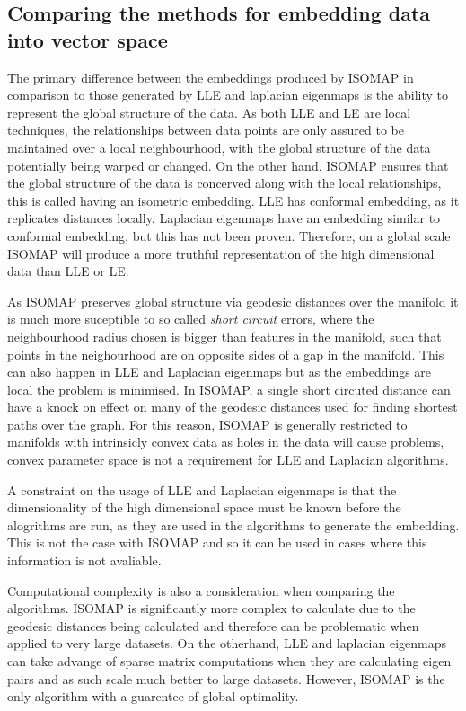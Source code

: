 \documentclass{article}
\begin{document}
\subsection{Comparing the methods for embedding data into vector space}
The primary difference between the embeddings produced by ISOMAP in comparison to those generated by LLE and laplacian eigenmaps is the ability to represent the global structure of the data. As both LLE and LE are local techniques, the relationships between data points are only assured to be maintained over a local neighbourhood, with the global structure of the data potentially being warped or changed. On the other hand, ISOMAP ensures that the global structure of the data is concerved along with the local relationships, this is called having an isometric embedding. LLE has conformal embedding, as it replicates distances locally. Laplacian eigenmaps have an embedding similar to conformal embedding, but this has not been proven.\cite{cayton2005algorithms} Therefore, on a global scale ISOMAP will produce a more truthful representation of the high dimensional data than LLE or LE. 

As ISOMAP preserves global structure via geodesic distances over the manifold it is much more suceptible to so called \textit{short circuit} errors, where the neighbourhood radius chosen is bigger than features in the manifold, such that points in the neighourhood are on opposite sides of a gap in the manifold. This can also happen in LLE and Laplacian eigenmaps but as the embeddings are local the problem is minimised. In ISOMAP, a single short circuted distance can have a knock on effect on many of the geodesic distances used for finding shortest paths over the graph. For this reason, ISOMAP is generally restricted to manifolds with intrinsicly convex data as holes in the data will cause problems, convex parameter space is not a requirement for LLE and Laplacian algorithms.

A constraint on the usage of LLE and Laplacian eigenmaps is that the dimensionality of the high dimensional space must be known before the alogrithms are run, as they are used in the algorithms to generate the embedding. This is not the case with ISOMAP and so it can be used in cases where this information is not avaliable. 

Computational complexity is also a consideration when comparing the algorithms. ISOMAP is significantly more complex to calculate due to the geodesic distances being calculated and therefore can be problematic when applied to very large datasets. On the otherhand, LLE and laplacian eigenmaps can take advange of sparse matrix computations when they are calculating eigen pairs and as such scale much better to large datasets. However, ISOMAP is the only algorithm with a guarentee of global optimality.
\end{document}
